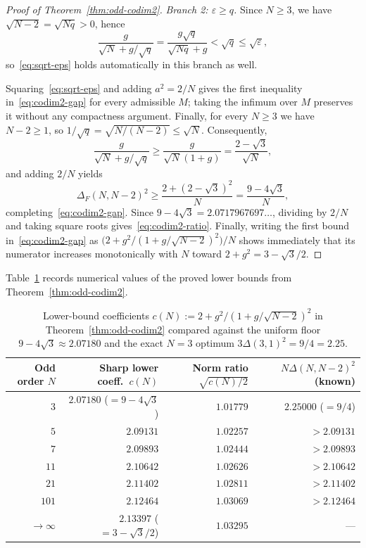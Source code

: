 \documentclass[11pt,reqno]{amsart}
\numberwithin{equation}{section}
\theoremstyle{definition}
\theoremstyle{remark}
\begin{document}
\begin{proof}[Proof of Theorem~\ref{thm:odd-codim2}]
\smallskip
\noindent\emph{Branch 2: $\varepsilon \ge q$.}
Since $N\ge 3$, we have $\sqrt{N-2}=\sqrt{Nq}>0$, hence
\[
\frac{g}{\sqrt{N} + g/\sqrt{q}} = \frac{g\sqrt{q}}{\sqrt{Nq} + g} < \sqrt{q} \le \sqrt{\varepsilon},
\]
so~\eqref{eq:sqrt-eps} holds automatically in this branch as well.

\smallskip
Squaring~\eqref{eq:sqrt-eps} and adding $a^2=2/N$ gives the first inequality in~\eqref{eq:codim2-gap} for every admissible $M$; taking the infimum over $M$ preserves it without any compactness argument. Finally, for every $N\ge 3$ we have $N-2\ge 1$, so $1/\sqrt{q}=\sqrt{N/(N-2)}\le\sqrt{N}$. Consequently,
\[
\frac{g}{\sqrt{N}+g/\sqrt{q}} \ge \frac{g}{\sqrt{N}(1+g)} = \frac{2-\sqrt{3}}{\sqrt{N}},
\]
and adding $2/N$ yields
\[
\Delta_F(N,N-2)^2 \ge \frac{2 + (2-\sqrt{3})^2}{N} = \frac{9 - 4\sqrt{3}}{N},
\]
completing~\eqref{eq:codim2-gap}. Since $9-4\sqrt{3} = 2.0717967697\ldots$, dividing by $2/N$ and taking square roots gives~\eqref{eq:codim2-ratio}. Finally, writing the first bound in~\eqref{eq:codim2-gap} as $\bigl(2 + g^2/(1 + g/\sqrt{N-2})^2\bigr)/N$ shows immediately that its numerator increases monotonically with $N$ toward $2+g^2 = 3-\sqrt{3}/2$.
\end{proof}

Table~\ref{tab:codim2-bounds} records numerical values of the proved lower bounds from Theorem~\ref{thm:odd-codim2}.

\begin{table}[ht]
\centering
\caption{Lower-bound coefficients $c(N) := 2 + g^2/(1 + g/\sqrt{N-2})^2$ in Theorem~\ref{thm:odd-codim2} compared against the uniform floor $9-4\sqrt{3}\approx 2.07180$ and the exact $N=3$ optimum $3\Delta(3,1)^2=9/4=2.25$.}
\label{tab:codim2-bounds}
\begin{tabular}{rrrr}
\toprule
Odd order $N$ & Sharp lower coeff.\ $c(N)$ & Norm ratio $\sqrt{c(N)/2}$ & $N\Delta(N,N-2)^2$ (known) \\
\midrule
$3$ & $2.07180$ ($=9-4\sqrt{3}$) & $1.01779$ & $2.25000$ ($=9/4$) \\
$5$ & $2.09131$ & $1.02257$ & $>2.09131$ \\
$7$ & $2.09893$ & $1.02444$ & $>2.09893$ \\
$11$ & $2.10642$ & $1.02626$ & $>2.10642$ \\
$21$ & $2.11402$ & $1.02811$ & $>2.11402$ \\
$101$ & $2.12464$ & $1.03069$ & $>2.12464$ \\
$\to\infty$ & $2.13397$ ($=3-\sqrt{3}/2$) & $1.03295$ & --- \\
\bottomrule
\end{tabular}
\end{table}
\end{document}
